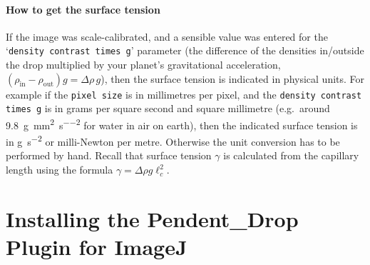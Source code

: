 \documentclass[fleqn]{scrartcl}
\begin{document}
\paragraph{How to get the surface tension}
If the image was scale-calibrated, and a sensible value was entered
for the `\texttt{density contrast times g}' parameter (the difference
of the densities in/outside the drop multiplied by your planet's
gravitational acceleration, $(\rho_{\mathrm{in}}-\rho_{\mathrm{out}})g
= \Delta\rho\,g$), then the surface tension is indicated in physical
units. For example if the \texttt{pixel size} is in millimetres per
pixel, and the \texttt{density contrast times g} is in grams per
square second and square millimetre (e.g.\ around
\SI{9.8}{\gram\per\square\milli\metre\per\square\second} for water in
air on earth), then the indicated surface tension is in
\si{\gram\per\square\second} or milli-Newton per metre. Otherwise the
unit conversion has to be performed by hand. Recall that surface
tension $\gamma$ is calculated from the capillary length using the
formula $\gamma = \Delta\!\rho g \ell_c^2$.


\section{Installing the Pendent\_Drop Plugin for ImageJ}
\label{sec:installation}
\end{document}
